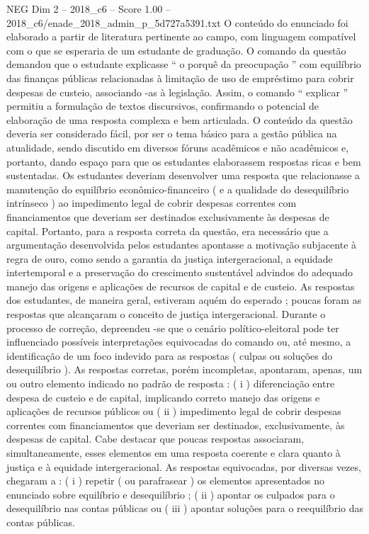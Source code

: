 \begin{textsample}{NEG Dim 2 – 2018\_c6 – Score 1.00 – 2018\_c6/enade\_2018\_admin\_p\_5d727a5391.txt}
O conteúdo do enunciado foi elaborado a partir de literatura pertinente ao campo, com linguagem compatível com o que se esperaria de um estudante de graduação.
O comando da questão demandou que o estudante explicasse “ o porquê da preocupação ” com equilíbrio das finanças públicas relacionadas à limitação de uso de empréstimo para cobrir despesas de custeio, associando -as à legislação.
Assim, o comando “ explicar ” permitiu a formulação de textos discursivos, confirmando o potencial de elaboração de uma resposta complexa e bem articulada.
O conteúdo da questão deveria ser considerado fácil, por ser o tema básico para a gestão pública na atualidade, sendo discutido em diversos fóruns acadêmicos e não acadêmicos e, portanto, dando espaço para que os estudantes elaborassem respostas ricas e bem sustentadas.
Os estudantes deveriam desenvolver uma resposta que relacionasse a manutenção do equilíbrio econômico-financeiro ( e a qualidade do desequilíbrio intrínseco ) ao impedimento legal de cobrir despesas correntes com financiamentos que deveriam ser destinados exclusivamente às despesas de capital.
Portanto, para a resposta correta da questão, era necessário que a argumentação desenvolvida pelos estudantes apontasse a motivação subjacente à regra de ouro, como sendo a garantia da justiça intergeracional, a equidade intertemporal e a preservação do crescimento sustentável advindos do adequado manejo das origens e aplicações de recursos de capital e de custeio.
As respostas dos estudantes, de maneira geral, estiveram aquém do esperado ; poucas foram as respostas que alcançaram o conceito de justiça intergeracional.
Durante o processo de correção, depreendeu -se que o cenário político-eleitoral pode ter influenciado possíveis interpretações equivocadas do comando ou, até mesmo, a identificação de um foco indevido para as respostas ( culpas ou soluções do desequilíbrio ).
As respostas corretas, porém incompletas, apontaram, apenas, um ou outro elemento indicado no padrão de resposta : ( i ) diferenciação entre despesa de custeio e de capital, implicando correto manejo das origens e aplicações de recursos públicos ou ( ii ) impedimento legal de cobrir despesas correntes com financiamentos que deveriam ser destinados, exclusivamente, às despesas de capital.
Cabe destacar que poucas respostas associaram, simultaneamente, esses elementos em uma resposta coerente e clara quanto à justiça e à equidade intergeracional.
As respostas equivocadas, por diversas vezes, chegaram a : ( i ) repetir ( ou parafrasear ) os elementos apresentados no enunciado sobre equilíbrio e desequilíbrio ; ( ii ) apontar os culpados para o desequilíbrio nas contas públicas ou ( iii ) apontar soluções para o reequilíbrio das contas públicas.

\end{textsample}
